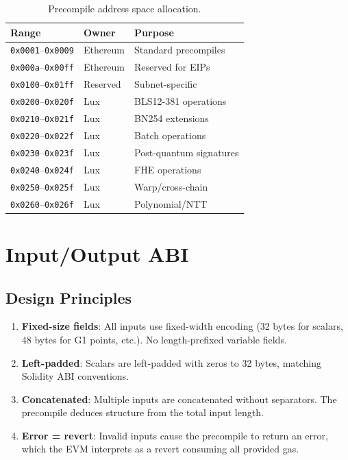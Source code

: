 \documentclass[11pt,a4paper]{article}
\begin{document}
\begin{table}[H]
\centering
\small
\begin{tabular}{@{}lll@{}}
\toprule
\textbf{Range} & \textbf{Owner} & \textbf{Purpose} \\
\midrule
\texttt{0x0001}--\texttt{0x0009} & Ethereum & Standard precompiles \\
\texttt{0x000a}--\texttt{0x00ff} & Ethereum & Reserved for EIPs \\
\texttt{0x0100}--\texttt{0x01ff} & Reserved & Subnet-specific \\
\texttt{0x0200}--\texttt{0x020f} & Lux & BLS12-381 operations \\
\texttt{0x0210}--\texttt{0x021f} & Lux & BN254 extensions \\
\texttt{0x0220}--\texttt{0x022f} & Lux & Batch operations \\
\texttt{0x0230}--\texttt{0x023f} & Lux & Post-quantum signatures \\
\texttt{0x0240}--\texttt{0x024f} & Lux & FHE operations \\
\texttt{0x0250}--\texttt{0x025f} & Lux & Warp/cross-chain \\
\texttt{0x0260}--\texttt{0x026f} & Lux & Polynomial/NTT \\
\bottomrule
\end{tabular}
\caption{Precompile address space allocation.}
\end{table}

\section{Input/Output ABI}

\subsection{Design Principles}

\begin{enumerate}[nosep]
  \item \textbf{Fixed-size fields}: All inputs use fixed-width encoding (32 bytes for
    scalars, 48 bytes for G1 points, etc.). No length-prefixed variable fields.
  \item \textbf{Left-padded}: Scalars are left-padded with zeros to 32 bytes, matching
    Solidity ABI conventions.
  \item \textbf{Concatenated}: Multiple inputs are concatenated without separators. The
    precompile deduces structure from the total input length.
  \item \textbf{Error = revert}: Invalid inputs cause the precompile to return an error,
    which the EVM interprets as a revert consuming all provided gas.
\end{enumerate}
\end{document}
